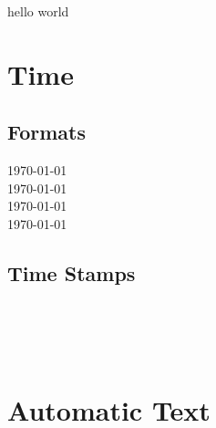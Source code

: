 \documentclass{article}
\begin{document}
hello world
\section{Time}
\subsection{Formats}
\photodate\today{}\\
\reallyshortusdate\today{}\\
\shortusdate\today{}\\
\longusdate\today{}\\
\subsection{Time Stamps}
\reallysmalltimestamp\\
\smalltimestamp\\
\timestamp\\

\section{Automatic Text}
\terminaltimestamps
\end{document}
